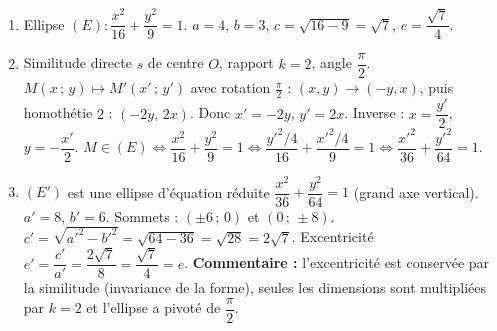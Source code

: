 \documentclass[11pt]{article}
\begin{document}
\begin{corrige}
\begin{enumerate}
\item Ellipse $(E) : \dfrac{x^{2}}{16} + \dfrac{y^{2}}{9} = 1$. $a=4$, $b=3$, $c = \sqrt{16-9} = \sqrt{7}$, $e = \dfrac{\sqrt{7}}{4}$.
\item Similitude directe $s$ de centre $O$, rapport $k=2$, angle $\dfrac{\pi}{2}$.
  $M(x\,;\,y) \mapsto M'(x'\,;\,y')$ avec rotation $\frac{\pi}{2}$ : $(x,y) \to (-y,x)$, puis homothétie $2$ : $(-2y,\,2x)$.
  Donc $x' = -2y$, $y' = 2x$. Inverse : $x = \dfrac{y'}{2}$, $y = -\dfrac{x'}{2}$.
  $M \in (E) \iff \dfrac{x^{2}}{16} + \dfrac{y^{2}}{9} = 1 \iff \dfrac{y'^{2}/4}{16} + \dfrac{x'^{2}/4}{9} = 1 \iff \dfrac{x'^{2}}{36} + \dfrac{y'^{2}}{64} = 1$.
\item $(E')$ est une ellipse d'équation réduite $\dfrac{x^{2}}{36} + \dfrac{y^{2}}{64} = 1$ (grand axe vertical).
  $a' = 8$, $b' = 6$. Sommets : $(\pm 6\,;\,0)$ et $(0\,;\,\pm 8)$.
  $c' = \sqrt{a'^{2} - b'^{2}} = \sqrt{64-36} = \sqrt{28} = 2\sqrt{7}$.
  Excentricité $e' = \dfrac{c'}{a'} = \dfrac{2\sqrt{7}}{8} = \dfrac{\sqrt{7}}{4} = e$.
  \textbf{Commentaire :} l'excentricité est conservée par la similitude (invariance de la forme), seules les dimensions sont multipliées par $k=2$ et l'ellipse a pivoté de $\dfrac{\pi}{2}$.
\end{enumerate}
\end{corrige}
\end{document}
